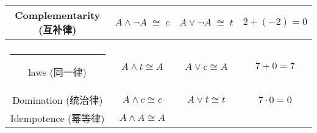 \begin{tabular}{c|c|c|c}
   \begin{minipage}{.25\textwidth} \rule{0pt}{22pt}\index{complementarity law}Complementarity (互补律)\rule[-10pt]{0pt}{10pt} \end{minipage} & 
   \begin{minipage}{.25\textwidth} \centerline{$A \land {\lnot}A \; \cong \; c$} \end{minipage} & 
   \begin{minipage}{.25\textwidth} \centerline{$A \lor {\lnot}A \; \cong \; t$} \end{minipage} &  
   \begin{minipage}{.25\textwidth} \centerline{$2 + (-2) = 0$} \end{minipage} \\ \hline 
   \begin{minipage}{.25\textwidth} \rule{0pt}{22pt}\index{identity law}Identity \\ \rule{12pt}{0pt} laws (同一律)\rule[-10pt]{0pt}{10pt} \end{minipage} & 
   \begin{minipage}{.25\textwidth} \centerline{$A \land t \cong A$} \end{minipage} & 
   \begin{minipage}{.25\textwidth} \centerline{$A \lor c \cong A$} \end{minipage} & 
   \begin{minipage}{.25\textwidth} \centerline{$7 + 0 = 7$} \end{minipage}\\ \hline 
   \begin{minipage}{.25\textwidth} \rule{0pt}{22pt}\index{domination law}Domination (统治律)\rule[-10pt]{0pt}{10pt} \end{minipage} & 
   \begin{minipage}{.25\textwidth}  \centerline{$A \land c \cong c$} \end{minipage} & 
   \begin{minipage}{.25\textwidth} \centerline{$A \lor t \cong t$} \end{minipage} & 
   \begin{minipage}{.25\textwidth} \centerline{$7 \cdot 0 = 0$} \end{minipage}\\ \hline
   \begin{minipage}{.25\textwidth} \rule{0pt}{22pt}\index{idempotence}Idempotence (幂等律)\rule[-10pt]{0pt}{10pt} \end{minipage} & 
   \begin{minipage}{.25\textwidth} \centerline{$A \land A \cong A$} \end{minipage} & 

\end{tabular}
